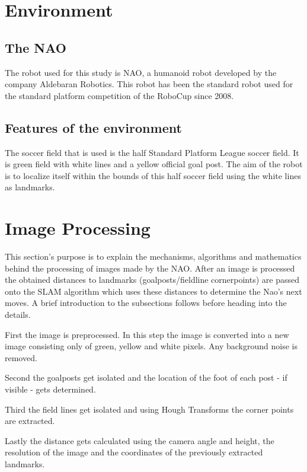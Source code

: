 \documentclass{ba-kecs}
\numberwithin{figure}{section}
\numberwithin{equation}{section}
\begin{document}

\section{Environment}
\subsection{The NAO}
The robot used for this study is NAO, a humanoid robot developed by the company Aldebaran Robotics. This robot has been the standard robot used for the standard platform competition of the RoboCup since 2008.


\subsection{Features of the environment}
The soccer field that is used is the half Standard Platform League soccer field. It is green field with white lines and a yellow official goal post. The aim of the robot is to localize itself within the bounds of this half soccer field using the white lines as landmarks.





\section{Image Processing}

This section's purpose is to explain the mechanisms, algorithms and mathematics behind the processing of images made by the NAO.
After an image is processed the obtained distances to landmarks (goalposts/fieldline cornerpoints) are passed onto the SLAM algorithm which uses these distances to determine the Nao's next moves.
A brief introduction to the subsections follows before heading into the details.

First the image is preprocessed. In this step the image is converted into a new image consisting only of green, yellow and white pixels. Any background noise is removed.

Second the goalposts get isolated and the location of the foot of each post - if visible - gets determined.

Third the field lines get isolated and using Hough Transforms the corner points are extracted.

Lastly the distance gets calculated using the camera angle and height, the resolution of the image and the coordinates of the previously extracted landmarks.
\end{document}
